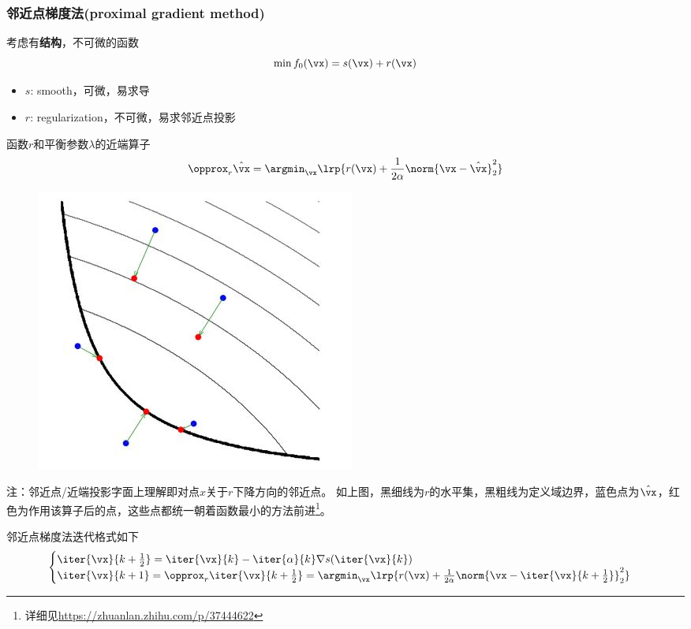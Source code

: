 \subsubsection{邻近点梯度法(proximal gradient method)}
考虑有\textbf{结构}，不可微的函数
\[\min f_0(\vx)=s(\vx)+r(\vx)\]
\begin{itemize}
    \item $s$: smooth，可微，易求导
    \item $r$: regularization，不可微，易求邻近点投影
\end{itemize}

\begin{definition}
    函数$r$和平衡参数$\lambda$的近端算子
\[\opprox_r \hat{\vx}=\argmin_\vx \lrp{r(\vx)+\frac{1}{2\alpha}\norm{\vx-\hat{\vx}}_2^2}\]
\begin{figure}[H]
    \centering
    \includegraphics[width=0.4\linewidth]{fig/prox.jpg}
\end{figure}
注：邻近点/近端投影字面上理解即对点$\hat{x}$关于$r$下降方向的邻近点。
如上图，黑细线为$r$的水平集，黑粗线为定义域边界，蓝色点为$\hat{\vx}$，红色为作用该算子后的点，这些点都统一朝着函数最小的方法前进\footnote{详细见\url{https://zhuanlan.zhihu.com/p/37444622}}。
\end{definition}
邻近点梯度法迭代格式如下
\[\begin{cases}
    \iter{\vx}{k+\frac{1}{2}}=\iter{\vx}{k}-\iter{\alpha}{k}\nabla s(\iter{\vx}{k})\\
    \iter{\vx}{k+1}=\opprox_{r}\iter{\vx}{k+\frac{1}{2}}=\argmin_\vx\lrp{r(\vx)+\frac{1}{2\alpha}\norm{\vx-\iter{\vx}{k+\frac{1}{2}}}_2^2}
\end{cases}\]

